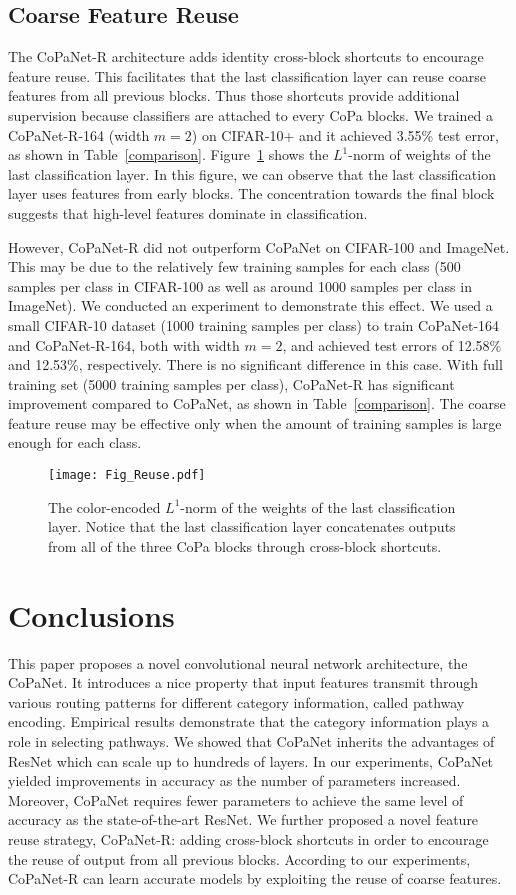 \documentclass[wcp]{jmlr}
\begin{document}
\subsection{Coarse Feature Reuse}
The CoPaNet-R architecture adds identity cross-block shortcuts to encourage feature reuse.
This facilitates that the last classification layer can reuse coarse features from all previous blocks.
Thus those shortcuts provide additional supervision because classifiers are attached to every CoPa blocks.
We trained a CoPaNet-R-164 (width $m=2$) on CIFAR-10+ and it achieved 3.55\% test error, as shown in Table~\ref{comparison}.
Figure~\ref{reuse} shows the $L^1$-norm of weights of the last classification layer. 
In this figure, we can observe that the last classification layer uses features from early blocks.
The concentration towards the final block suggests that high-level features dominate in classification.

However, CoPaNet-R did not outperform CoPaNet on CIFAR-100 and ImageNet.
This may be due to the relatively few training samples for each class (500 samples per class in CIFAR-100 as well as around 1000 samples per class in ImageNet).
We conducted an experiment to demonstrate this effect.
We used a small CIFAR-10 dataset (1000 training samples per class) to train CoPaNet-164 and CoPaNet-R-164, both with width $m=2$, and achieved test errors of 12.58\% and 12.53\%, respectively.
There is no significant difference in this case.
With full training set (5000 training samples per class), CoPaNet-R has significant improvement compared to CoPaNet, as shown in Table~\ref{comparison}.
The coarse feature reuse may be effective only when the amount of training samples is large enough for each class.

\begin{figure}
\centering
\texttt{[image: Fig\_Reuse.pdf]}
\caption{The color-encoded $L^1$-norm of the weights of the last classification layer. Notice that the last classification layer  concatenates outputs from all of the three CoPa blocks through cross-block shortcuts.}
\label{reuse}
\end{figure}


\section{Conclusions}
This paper proposes a novel convolutional neural network architecture, the CoPaNet. 
It introduces a nice property that input features transmit through various routing patterns for different category information, called pathway encoding.
Empirical results demonstrate that the category information plays a role in selecting pathways.
We showed that CoPaNet inherits the advantages of ResNet which can scale up to hundreds of layers.
In our experiments, CoPaNet yielded improvements in accuracy as the number of parameters increased. 
Moreover, CoPaNet requires fewer parameters to achieve the same level of accuracy as the state-of-the-art ResNet.
We  further proposed a novel feature reuse strategy, CoPaNet-R: adding cross-block shortcuts in order to encourage the reuse of output from all previous blocks. 
According to our experiments, CoPaNet-R can learn accurate models by exploiting the reuse of coarse features.
\end{document}
